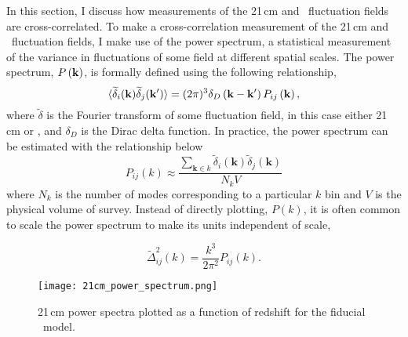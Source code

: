 \label{sec:cross-power}

In this section, I discuss how measurements of the 21\,cm and \lya\ fluctuation fields are
cross-correlated. To make a cross-correlation measurement of the 21\,cm and \lya\
fluctuation fields, I make use of the power spectrum, a statistical measurement
of the variance in fluctuations of some field at different spatial scales. The power
spectrum, $P \left({\bf k} \right)$, is formally defined using the following relationship,
\begin{equation}
\langle \widetilde{\delta}_i ({\bf k}) \widetilde{\delta}_j ({\bf k'}) \rangle = (2 \pi) ^3 \delta_D \left( {\bf k} - {\bf k'} \right) P_{ij} \left({\bf k} \right),
\end{equation}
where $\widetilde{\delta}$ is the Fourier transform of some fluctuation field, in this
case either 21\,cm or \lya, and $\delta_D$ is the Dirac delta function.
In practice, the power spectrum can be estimated with the relationship below
\begin{equation}
P_{ij}\left( k\right) \approx \frac{\sum_{\textbf{k} \in k} \widetilde{\delta}_i \left( \textbf{k}\right) \widetilde{\delta}_j \left( \textbf{k}\right)}{N_k V}
\end{equation}
where $N_k$ is the number of modes corresponding to a particular $k$ bin and $V$ is
the physical volume of survey. Instead of directly plotting, $P\left( k\right)$,
it is often common to scale the power spectrum to make its units independent of
scale,

\begin{equation}
    \widetilde{\Delta}^2_{ij} \left( k \right) = \frac{k^3}{2 \pi ^2} P_{ij} \left( k \right).
\end{equation}

\begin{figure}[ht]
	\centering
	\texttt{[image: 21cm\_power\_spectrum.png]}
	\caption[21\,cm Power Spectrum]{21\,cm power spectra plotted as a function of redshift for the fiducial \fastsim\
           model.}
	\label{fig:21cm_ps}
\end{figure}

